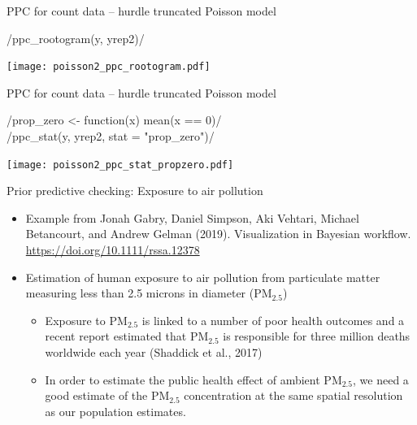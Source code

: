 \documentclass[t]{beamer}
\begin{document}
\begin{frame}{PPC for count data -- hurdle truncated Poisson model}
  
  \vspace{-1\baselineskip}
  \rinline/ppc_rootogram(y, yrep2)/

    \texttt{[image: poisson2\_ppc\_rootogram.pdf]}

\end{frame}

\begin{frame}{PPC for count data -- hurdle truncated Poisson model}
  
  \vspace{-1\baselineskip}
  \rinline/prop_zero <- function(x) mean(x == 0)/\\
  \rinline/ppc_stat(y, yrep2, stat = "prop_zero")/

    \texttt{[image: poisson2\_ppc\_stat\_propzero.pdf]}

\end{frame}

\begin{frame}{Prior predictive checking: Exposure to air pollution}

  \begin{itemize}
  \item Example from Jonah Gabry, Daniel Simpson, Aki Vehtari, Michael
    Betancourt, and Andrew Gelman (2019). Visualization in Bayesian
    workflow. \url{https://doi.org/10.1111/rssa.12378}
  \item Estimation of human exposure to air pollution from particulate
    matter measuring less than 2.5 microns in diameter ($\mathrm{PM}_{2.5}$)
    \begin{itemize}
    \item Exposure to $\mathrm{PM}_{2.5}$ is linked to a number of
      poor health outcomes and a recent report estimated that
      $\mathrm{PM}_{2.5}$ is responsible for three million deaths
      worldwide each year (Shaddick et al., 2017)
    \item In order to estimate the public health effect of ambient
      $\mathrm{PM}_{2.5}$, we need a good estimate of the
      $\mathrm{PM}_{2.5}$ concentration at the same spatial resolution
      as our population estimates.
    \end{itemize}
\end{itemize}

\end{frame}
\end{document}
